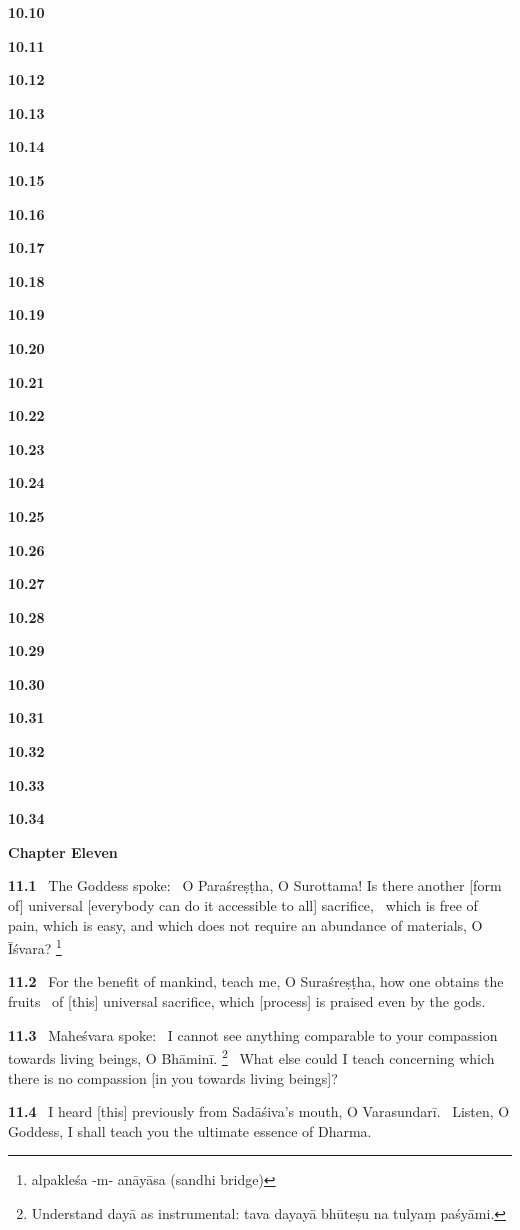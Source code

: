 \documentclass{article}
\begin{document}
\textbf{10.10}%


\textbf{10.11}%


\textbf{10.12}%


\textbf{10.13}%


\textbf{10.14}%


\textbf{10.15}%


\textbf{10.16}%


\textbf{10.17}%


\textbf{10.18}%


\textbf{10.19}%


\textbf{10.20}%


\textbf{10.21}%


\textbf{10.22}%


\textbf{10.23}%


\textbf{10.24}%


\textbf{10.25}%


\textbf{10.26}%


\textbf{10.27}%


\textbf{10.28}%


\textbf{10.29}%


\textbf{10.30}%


\textbf{10.31}%


\textbf{10.32}%


\textbf{10.33}%


\textbf{10.34}%
\vfill\pagebreak\begin{center}{\large\textbf{ Chapter Eleven 
}}\end{center}


\textbf{11.1}%
\ The Goddess spoke:%
\ O Paraśreṣṭha, O Surottama! Is there another [form of] universal [everybody can do it accessible to all] sacrifice,%
\ which is free of pain, which is easy, and which does not require an abundance of materials, O Īśvara?%
\footnote{alpakleśa -m- anāyāsa (sandhi bridge) }%


\textbf{11.2}%
\ For the benefit of mankind, teach me, O Suraśreṣṭha, how one obtains the fruits%
\                      of [this] universal sacrifice, which [process] is praised even by the gods.%


\textbf{11.3}%
\ Maheśvara spoke:%
\ I cannot see anything comparable to your compassion towards living beings, O Bhāminī.%
\footnote{Understand dayā as instrumental: tava dayayā bhūteṣu na tulyaṃ paśyāmi. }%
\ What else could I teach concerning which there is no compassion [in you towards living beings]?%


\textbf{11.4}%
\ I heard [this] previously from Sadāśiva's mouth, O Varasundarī.%
\ Listen, O Goddess, I shall teach you the ultimate essence of Dharma.%
\end{document}
